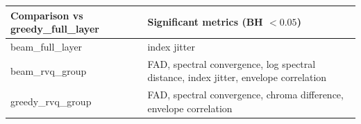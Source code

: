 \begin{tabular}{ll}
\toprule
Comparison vs greedy\_full\_layer & Significant metrics (BH $< 0.05$) \\
\midrule
beam\_full\_layer & index jitter \\
beam\_rvq\_group & FAD, spectral convergence, log spectral distance, index jitter, envelope correlation \\
greedy\_rvq\_group & FAD, spectral convergence, chroma difference, envelope correlation \\
\bottomrule
\end{tabular}
